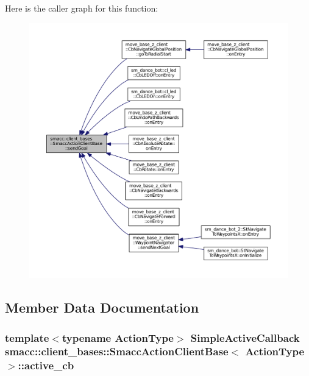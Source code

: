 Here is the caller graph for this function\+:
\nopagebreak
\begin{figure}[H]
\begin{center}
\leavevmode
\includegraphics[width=350pt]{classsmacc_1_1client__bases_1_1SmaccActionClientBase_a9c47a5094ac8afb01680307fe5eca922_icgraph}
\end{center}
\end{figure}




\subsection{Member Data Documentation}
\subsubsection[{\texorpdfstring{active\+\_\+cb}{active_cb}}]{\setlength{\rightskip}{0pt plus 5cm}template$<$typename Action\+Type$>$ {\bf Simple\+Active\+Callback} {\bf smacc\+::client\+\_\+bases\+::\+Smacc\+Action\+Client\+Base}$<$ Action\+Type $>$\+::active\+\_\+cb}\hypertarget{classsmacc_1_1client__bases_1_1SmaccActionClientBase_a8aada706b9b8ca50792b48c2f990394a}{}\label{classsmacc_1_1client__bases_1_1SmaccActionClientBase_a8aada706b9b8ca50792b48c2f990394a}


